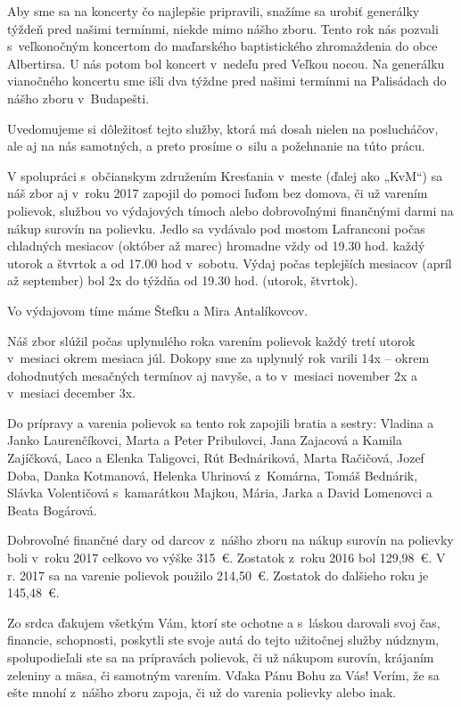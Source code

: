Aby sme sa na koncerty čo najlepšie pripravili, snažíme sa urobiť generálky týždeň pred našimi termínmi, niekde mimo nášho zboru. Tento rok nás pozvali s~veľkonočným koncertom do maďarského baptistického zhromaždenia do obce Albertirsa. U nás potom bol koncert v~nedeľu pred Veľkou nocou.
Na generálku vianočného koncertu sme išli dva týždne pred našimi termínmi na Palisádach do nášho zboru v~Budapešti.

Uvedomujeme si dôležitosť tejto služby, ktorá má dosah nielen na poslucháčov, ale aj na nás samotných, a preto prosíme o~silu a požehnanie na túto prácu.



V spolupráci s~občianskym združením Kresťania v~meste (ďalej ako „KvM“) sa náš zbor aj v~roku 2017 zapojil do pomoci ľuďom bez domova, či už varením polievok, službou vo výdajových tímoch alebo dobrovoľnými finančnými darmi na nákup surovín na polievku. Jedlo sa vydávalo  pod mostom Lafranconi počas chladných mesiacov (október až marec) hromadne vždy od 19.30 hod. každý utorok a štvrtok a od 17.00 hod v~sobotu. Výdaj počas teplejších mesiacov (apríl až september) bol 2x do týždňa od 19.30 hod. (utorok, štvrtok).

Vo výdajovom tíme máme Štefku a Mira Antalíkovcov.

Náš zbor slúžil počas uplynulého roka varením polievok každý tretí utorok v~mesiaci okrem mesiaca júl. Dokopy sme za uplynulý rok varili 14x – okrem  dohodnutých mesačných termínov aj navyše, a to v~mesiaci november 2x a v~mesiaci december 3x.

Do prípravy a varenia polievok sa tento rok zapojili bratia a sestry: Vladina a Janko Laurenčíkovci, Marta a Peter Pribulovci, Jana Zajacová a Kamila Zajíčková, Laco a Elenka Taligovci, Rút Bednáriková, Marta Račičová, Jozef Doba, Danka Kotmanová, Helenka Uhrinová z~Komárna, Tomáš Bednárik, Slávka Volentičová s~kamarátkou Majkou, Mária, Jarka a David Lomenovci a Beata Bogárová.

Dobrovoľné finančné dary od darcov z~nášho zboru na nákup surovín na polievky boli v~roku 2017 celkovo vo výške 315~€. Zostatok z~roku 2016 bol 129,98~€.    V r. 2017 sa na varenie polievok použilo 214,50~€. Zostatok do ďalšieho roku je 145,48~€.

Zo srdca ďakujem všetkým Vám, ktorí ste ochotne a s~láskou darovali svoj čas, financie, schopnosti, poskytli ste svoje autá do tejto užitočnej služby núdznym,  spolupodieľali ste sa na prípravách polievok, či už nákupom surovín, krájaním zeleniny a mäsa, či samotným varením. Vďaka Pánu Bohu za Vás! Verím, že sa ešte mnohí z~nášho zboru zapoja, či už do varenia polievky alebo inak.

